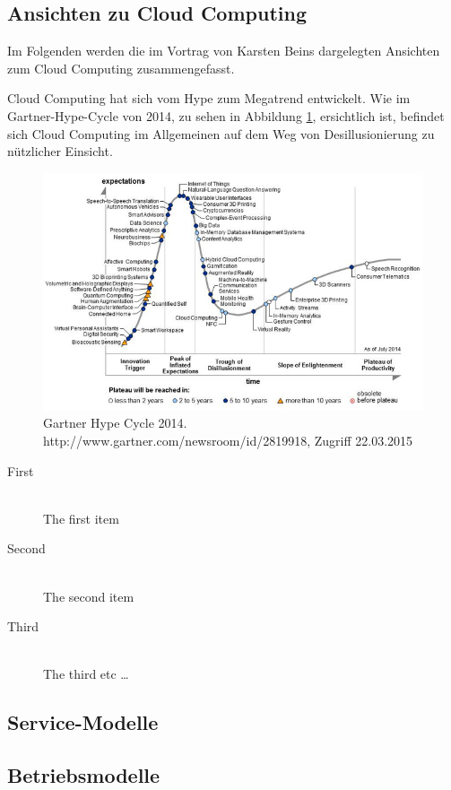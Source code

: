 \subsection{Ansichten zu Cloud Computing}
\label{sec_fujitsu_general}

Im Folgenden werden die im Vortrag von Karsten Beins\cite{vortragFujitsu} dargelegten Ansichten zum Cloud Computing zusammengefasst.

Cloud Computing hat sich vom Hype zum Megatrend entwickelt. 
Wie im Gartner-Hype-Cycle von 2014, zu sehen in Abbildung \ref{fig:gartnerHypeCycle2014}, ersichtlich ist, befindet sich Cloud Computing im Allgemeinen auf dem Weg von Desillusionierung zu nützlicher Einsicht. 

\begin{figure}
	\centering
	\includegraphics[width=0.8\linewidth]{images/gartnerHypeCycle2014}
	\caption{Gartner Hype Cycle 2014. http://www.gartner.com/newsroom/id/2819918, Zugriff 22.03.2015}
	\label{fig:gartnerHypeCycle2014}
\end{figure}

\begin{description}
  \item[First] \hfill \\
  The first item
  \item[Second] \hfill \\
  The second item
  \item[Third] \hfill \\
  The third etc \ldots
\end{description}


\subsection{Service-Modelle}
\label{sec_fujitsu_delivery}



\subsection{Betriebsmodelle}
\label{sec_fujitsu_deployment}

